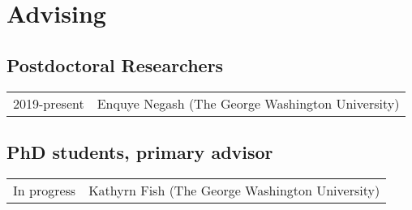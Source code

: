 \documentclass{article}
\newenvironment{mylist}
{\begin{description}[style=unboxed,leftmargin=1.3cm]}
{\end{description}}
\begin{document}
\begin{mylist}


\end{mylist}

\section*{Advising}
\subsection*{Postdoctoral Researchers}
\begin{tabular}{p{}p{}}
2019-present & Enquye Negash (The George Washington University)\\[4pt]
\end{tabular}

\subsection*{PhD students, primary advisor}
\begin{tabular}{p{}p{}}
In progress & Kathyrn Fish (The George Washington University)\\[4pt] %
\end{tabular}
\end{document}
